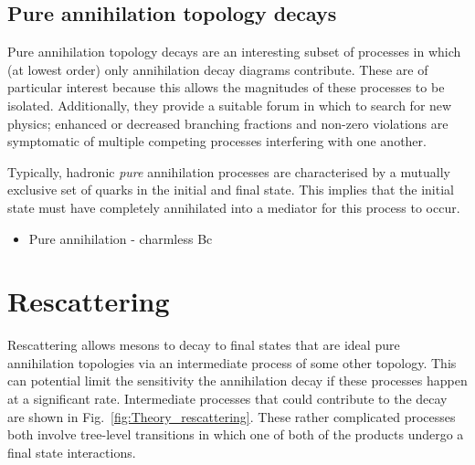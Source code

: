 \subsection{Pure annihilation topology decays}
Pure annihilation topology decays are an interesting subset of processes in which (at lowest order) only annihilation decay diagrams contribute. These are of particular interest because this allows the magnitudes of these processes to be isolated. Additionally, they provide a suitable forum in which to search for new physics; enhanced or decreased branching fractions and non-zero \CP violations are symptomatic of multiple competing processes interfering with one another.  

Typically, hadronic \emph{pure} annihilation processes are characterised by a mutually exclusive set of quarks in the initial and final state. This implies that the initial state must have completely annihilated into a mediator for this process to occur.   

{\color{Red}
\begin{itemize}
\item Pure annihilation - charmless Bc
\end{itemize}}


\section{Rescattering}

Rescattering allows \Bp mesons to decay to final states that are ideal pure annihilation topologies via an intermediate process of some other topology. This can potential limit the sensitivity the annihilation decay if these processes happen at a significant rate. Intermediate processes that could contribute to the \decay{\Bp}{\Dsp\phiz} decay are shown in Fig.~\ref{fig:Theory_rescattering}. These rather complicated processes both involve tree-level \decay{\bquarkbar}{\uquarkbar} transitions in which one of both of the products undergo a final state interactions.  

